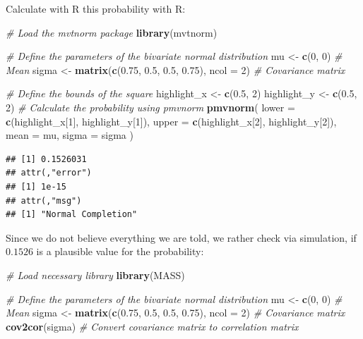 \documentclass[
]{book}
\newenvironment{Shaded}{\begin{snugshade}}{\end{snugshade}}
\newcommand{\AttributeTok}[1]{\textcolor[rgb]{0.13,0.29,0.53}{#1}}
\newcommand{\CommentTok}[1]{\textcolor[rgb]{0.56,0.35,0.01}{\textit{#1}}}
\newcommand{\DecValTok}[1]{\textcolor[rgb]{0.00,0.00,0.81}{#1}}
\newcommand{\FloatTok}[1]{\textcolor[rgb]{0.00,0.00,0.81}{#1}}
\newcommand{\FunctionTok}[1]{\textcolor[rgb]{0.13,0.29,0.53}{\textbf{#1}}}
\newcommand{\NormalTok}[1]{#1}
\newcommand{\OtherTok}[1]{\textcolor[rgb]{0.56,0.35,0.01}{#1}}
\begin{document}
Calculate with R this probability with R:

\begin{Shaded}
\begin{Highlighting}[]
\CommentTok{\# Load the mvtnorm package}
\FunctionTok{library}\NormalTok{(mvtnorm)}

\CommentTok{\# Define the parameters of the bivariate normal distribution}
\NormalTok{mu }\OtherTok{\textless{}{-}} \FunctionTok{c}\NormalTok{(}\DecValTok{0}\NormalTok{, }\DecValTok{0}\NormalTok{)                       }\CommentTok{\# Mean}
\NormalTok{sigma }\OtherTok{\textless{}{-}} \FunctionTok{matrix}\NormalTok{(}\FunctionTok{c}\NormalTok{(}\FloatTok{0.75}\NormalTok{, }\FloatTok{0.5}\NormalTok{, }\FloatTok{0.5}\NormalTok{, }\FloatTok{0.75}\NormalTok{), }\AttributeTok{ncol =} \DecValTok{2}\NormalTok{) }\CommentTok{\# Covariance matrix}

\CommentTok{\# Define the bounds of the square}
\NormalTok{highlight\_x }\OtherTok{\textless{}{-}} \FunctionTok{c}\NormalTok{(}\FloatTok{0.5}\NormalTok{, }\DecValTok{2}\NormalTok{)}
\NormalTok{highlight\_y }\OtherTok{\textless{}{-}} \FunctionTok{c}\NormalTok{(}\FloatTok{0.5}\NormalTok{, }\DecValTok{2}\NormalTok{)}
\CommentTok{\# Calculate the probability using pmvnorm}
\FunctionTok{pmvnorm}\NormalTok{(}
  \AttributeTok{lower =} \FunctionTok{c}\NormalTok{(highlight\_x[}\DecValTok{1}\NormalTok{], highlight\_y[}\DecValTok{1}\NormalTok{]),}
  \AttributeTok{upper =} \FunctionTok{c}\NormalTok{(highlight\_x[}\DecValTok{2}\NormalTok{], highlight\_y[}\DecValTok{2}\NormalTok{]),}
  \AttributeTok{mean =}\NormalTok{ mu,}
  \AttributeTok{sigma =}\NormalTok{ sigma}
\NormalTok{)}
\end{Highlighting}
\end{Shaded}

\begin{verbatim}
## [1] 0.1526031
## attr(,"error")
## [1] 1e-15
## attr(,"msg")
## [1] "Normal Completion"
\end{verbatim}

Since we do not believe everything we are told, we rather check via simulation,
if \(0.1526\) is a plausible value for the probability:

\begin{Shaded}
\begin{Highlighting}[]
\CommentTok{\# Load necessary library}
\FunctionTok{library}\NormalTok{(MASS)}

\CommentTok{\# Define the parameters of the bivariate normal distribution}
\NormalTok{mu }\OtherTok{\textless{}{-}} \FunctionTok{c}\NormalTok{(}\DecValTok{0}\NormalTok{, }\DecValTok{0}\NormalTok{)                       }\CommentTok{\# Mean}
\NormalTok{sigma }\OtherTok{\textless{}{-}} \FunctionTok{matrix}\NormalTok{(}\FunctionTok{c}\NormalTok{(}\FloatTok{0.75}\NormalTok{, }\FloatTok{0.5}\NormalTok{, }\FloatTok{0.5}\NormalTok{, }\FloatTok{0.75}\NormalTok{), }\AttributeTok{ncol =} \DecValTok{2}\NormalTok{) }\CommentTok{\# Covariance matrix}
\FunctionTok{cov2cor}\NormalTok{(sigma)  }\CommentTok{\# Convert covariance matrix to correlation matrix}
\end{Highlighting}
\end{Shaded}
\end{document}
